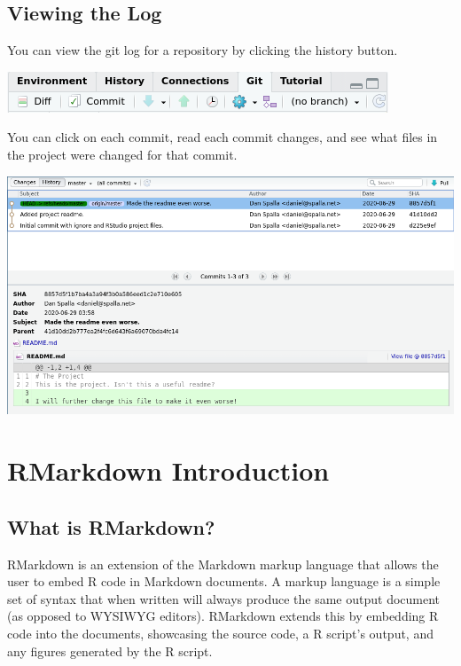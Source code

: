 \documentclass[
]{book}
\begin{document}
\hypertarget{viewing-the-log}{%
\section{Viewing the Log}\label{viewing-the-log}}

You can view the git log for a repository by clicking the history button.

\includegraphics{images/02-commit_1.png}

You can click on each commit, read each commit changes, and see what files in the project were changed for that commit.

\includegraphics{images/02-log_1.png}

\hypertarget{rmarkdown-introduction}{%
\chapter{RMarkdown Introduction}\label{rmarkdown-introduction}}

\hypertarget{what-is-rmarkdown}{%
\section{What is RMarkdown?}\label{what-is-rmarkdown}}

RMarkdown is an extension of the Markdown markup language that allows the user to embed R code in Markdown documents. A markup language is a simple set of syntax that when written will always produce the same output document (as opposed to WYSIWYG editors). RMarkdown extends this by embedding R code into the documents, showcasing the source code, a R script's output, and any figures generated by the R script.
\end{document}
